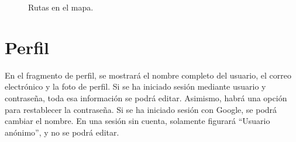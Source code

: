 \documentclass[a4paper,12pt]{report}
\begin{document}
\begin{figure}[H]
  \centering
  \hspace{0.5cm}
  \hspace{0.5cm}
  \caption{Rutas en el mapa.}
  \label{fig:rutas}
\end{figure}


\section{Perfil}
  En el fragmento de perfil, se mostrará el nombre completo del usuario, el correo electrónico y la foto de perfil. Si se ha iniciado sesión mediante usuario y contraseña, toda esa información se podrá editar. Asimismo, habrá una opción para restablecer la contraseña. Si se ha iniciado sesión con Google, se podrá cambiar el nombre. En una sesión sin cuenta, solamente figurará ``Usuario anónimo'', y no se podrá editar.
\end{document}
